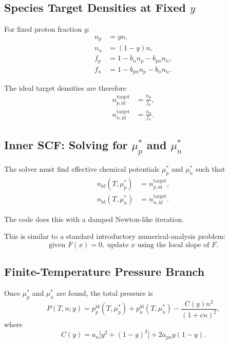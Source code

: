 \documentclass[11pt]{article}
\begin{document}
\subsection{Species Target Densities at Fixed \texorpdfstring{$y$}{y}}

For fixed proton fraction $y$:
\begin{align}
n_p &= yn, \\
n_n &= (1-y)n, \\
f_p &= 1-b_n n_p - b_{pn} n_n, \\
f_n &= 1-b_{pn} n_p - b_n n_n.
\end{align}

The ideal target densities are therefore
\begin{align}
n_{p,\mathrm{id}}^{\mathrm{target}} &= \frac{n_p}{f_p}, \\
n_{n,\mathrm{id}}^{\mathrm{target}} &= \frac{n_n}{f_n}.
\end{align}

\subsection{Inner SCF: Solving for \texorpdfstring{$\mu_p^\ast$}{mu*p} and \texorpdfstring{$\mu_n^\ast$}{mu*n}}

The solver must find effective chemical potentials $\mu_p^\ast$ and
$\mu_n^\ast$ such that
\begin{align}
n_{\mathrm{id}}(T,\mu_p^\ast)
&=
n_{p,\mathrm{id}}^{\mathrm{target}}, \\
n_{\mathrm{id}}(T,\mu_n^\ast)
&=
n_{n,\mathrm{id}}^{\mathrm{target}}.
\end{align}

The code does this with a damped Newton-like iteration.

This is similar to a standard introductory numerical-analysis problem:
\[
\text{given } F(x)=0,\ \text{update } x \text{ using the local slope of } F.
\]

\subsection{Finite-Temperature Pressure Branch}

Once $\mu_p^\ast$ and $\mu_n^\ast$ are found, the total pressure is
\begin{equation}
P(T,n;y)
=
p_p^{\mathrm{id}}(T,\mu_p^\ast)
+
p_n^{\mathrm{id}}(T,\mu_n^\ast)
-\frac{C(y)n^2}{(1+cn)^2},
\end{equation}
where
\begin{equation}
C(y)
=
a_n\big[y^2+(1-y)^2\big]
+2a_{pn}y(1-y).
\end{equation}
\end{document}
